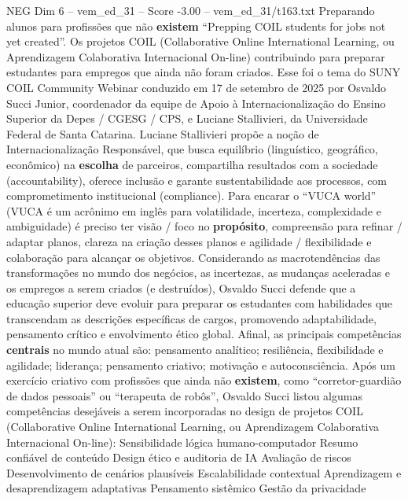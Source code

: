\begin{textsample}{NEG Dim 6 – vem\_ed\_31 – Score -3.00 – vem\_ed\_31/t163.txt}  \label{ex:f6_neg_107}
Preparando alunos para profissões que não \textbf{existem} “Prepping COIL students for jobs not yet created”.
Os projetos COIL (Collaborative Online International Learning, ou Aprendizagem Colaborativa Internacional On-line) contribuindo para preparar estudantes para empregos que ainda não foram criados.
Esse foi o tema do SUNY COIL Community Webinar conduzido em 17 de setembro de 2025 por Osvaldo Succi Junior, coordenador da equipe de Apoio à Internacionalização do Ensino Superior da Depes / CGESG / CPS, e Luciane Stallivieri, da Universidade Federal de Santa Catarina.
Luciane Stallivieri propõe a noção de Internacionalização Responsável, que busca equilíbrio (linguístico, geográfico, econômico) na \textbf{escolha} de parceiros, compartilha resultados com a sociedade (accountability), oferece inclusão e garante sustentabilidade aos processos, com comprometimento institucional (compliance).
Para encarar o “VUCA world” (VUCA é um acrônimo em inglês para volatilidade, incerteza, complexidade e ambiguidade) é preciso ter visão / foco no \textbf{propósito}, compreensão para refinar / adaptar planos, clareza na criação desses planos e agilidade / flexibilidade e colaboração para alcançar os objetivos.
Considerando as macrotendências das transformações no mundo dos negócios, as incertezas, as mudanças aceleradas e os empregos a serem criados (e destruídos), Osvaldo Succi defende que a educação superior deve evoluir para preparar os estudantes com habilidades que transcendam as descrições específicas de cargos, promovendo adaptabilidade, pensamento crítico e envolvimento ético global.
Afinal, as principais competências \textbf{centrais} no mundo atual são: pensamento analítico; resiliência, flexibilidade e agilidade; liderança; pensamento criativo; motivação e autoconsciência.
Após um exercício criativo com profissões que ainda não \textbf{existem}, como “corretor-guardião de dados pessoais” ou “terapeuta de robôs”, Osvaldo Succi listou algumas competências desejáveis a serem incorporadas no design de projetos COIL (Collaborative Online International Learning, ou Aprendizagem Colaborativa Internacional On-line): Sensibilidade lógica humano-computador Resumo confiável de conteúdo Design ético e auditoria de IA Avaliação de riscos Desenvolvimento de cenários plausíveis Escalabilidade contextual Aprendizagem e desaprendizagem adaptativas Pensamento sistêmico Gestão da privacidade

\end{textsample}
